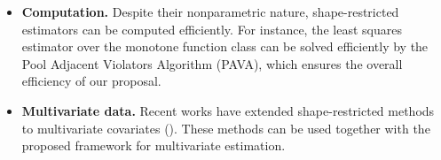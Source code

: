\documentclass[12pt]{article}
\begin{document}
\begin{itemize}
        \item \textbf{Computation.} Despite their nonparametric nature, shape-restricted estimators can be computed efficiently. For instance, the least squares estimator over the monotone function class can be solved efficiently by the Pool Adjacent Violators Algorithm (PAVA), which ensures the overall efficiency of our proposal. 
        \item \textbf{Multivariate data.} Recent works have extended shape-restricted methods to multivariate covariates (\cite{anevski2011monotone, basu2016transformations, han2019isotonic, deng2020isotonic, kur2020suboptimality}). These methods can be used together with the proposed framework for multivariate estimation.
\end{itemize}
\end{document}
